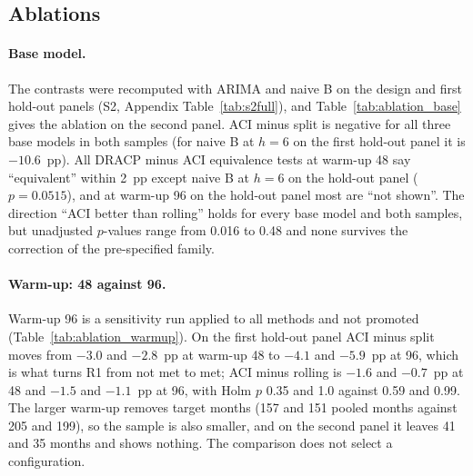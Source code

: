 \subsection{Ablations}\label{sec:ablation}

\paragraph{Base model.}\label{sec:basemodel} The contrasts were recomputed with ARIMA and naive B on the design and first hold-out panels (S2, Appendix Table~\ref{tab:s2full}), and Table~\ref{tab:ablation_base} gives the ablation on the second panel. ACI minus split is negative for all three base models in both samples (for naive B at $h=6$ on the first hold-out panel it is $-10.6$~pp). All DRACP minus ACI equivalence tests at warm-up 48 say ``equivalent'' within 2~pp except naive B at $h=6$ on the hold-out panel ($p=0.0515$), and at warm-up 96 on the hold-out panel most are ``not shown''. The direction ``ACI better than rolling'' holds for every base model and both samples, but unadjusted $p$-values range from 0.016 to 0.48 and none survives the correction of the pre-specified family.

\begin{table}[t]
\centering
\caption{Ablation over the base model on the second hold-out panel (warm-up 48): relative mean absolute error (naive B $=1$, all target months including flagged months), CE of ACI and of rolling, and ACI minus rolling in pp of CE with Holm $p$.}
\label{tab:ablation_base}
\small
\fittable{}
\end{table}

\paragraph{Warm-up: 48 against 96.} Warm-up 96 is a sensitivity run applied to all methods and not promoted (Table~\ref{tab:ablation_warmup}). On the first hold-out panel ACI minus split moves from $-3.0$ and $-2.8$~pp at warm-up 48 to $-4.1$ and $-5.9$~pp at 96, which is what turns R1 from not met to met; ACI minus rolling is $-1.6$ and $-0.7$~pp at 48 and $-1.5$ and $-1.1$~pp at 96, with Holm $p$ 0.35 and 1.0 against 0.59 and 0.99. The larger warm-up removes target months (157 and 151 pooled months against 205 and 199), so the sample is also smaller, and on the second panel it leaves 41 and 35 months and shows nothing. The comparison does not select a configuration.

